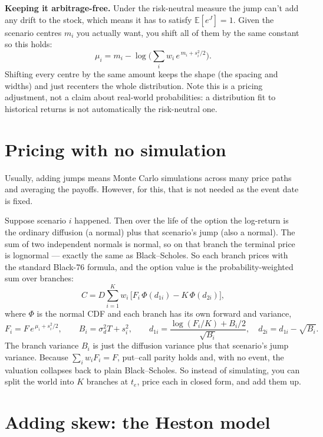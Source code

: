 \documentclass[11pt]{article}
\newcommand{\E}{\mathbb E}
\begin{document}
\textbf{Keeping it arbitrage-free.} Under the risk-neutral measure the jump can't
add any drift to the stock, which means it has to satisfy $\E[e^J]=1$. Given the
scenario centres $m_i$ you actually want, you shift all of them by the same
constant so this holds:
\begin{equation}
\mu_i = m_i - \log\!\Big(\textstyle\sum_i w_i\,e^{\,m_i+s_i^2/2}\Big).
\end{equation}
Shifting every centre by the same amount keeps the shape (the spacing and widths)
and just recenters the whole distribution. Note this is a pricing adjustment, not a claim
about real-world probabilities: a distribution fit to historical returns is not
automatically the risk-neutral one.

\section{Pricing with no simulation}

Usually, adding jumps means Monte Carlo simulations across many price paths and averaging
the payoffs. However, for this, that is not needed as the event date is fixed. 

Suppose scenario $i$ happened. Then over the life of the option the log-return is
the ordinary diffusion (a normal) plus that scenario's jump (also a normal). The
sum of two independent normals is normal, so on that branch the terminal price is
lognormal --- exactly the same as Black--Scholes. So each branch prices with the
standard Black-76 formula, and the option value is the probability-weighted sum
over branches:
\begin{equation}
C = D\sum_{i=1}^{K} w_i\,\big[F_i\,\Phi(d_{1i})-K\,\Phi(d_{2i})\big],
\end{equation}
where $\Phi$ is the normal CDF and each branch has its own forward and variance,
\begin{equation}
F_i = F\,e^{\,\mu_i+s_i^2/2},\qquad
B_i = \sigma_d^2 T + s_i^2,\qquad
d_{1i}=\frac{\log(F_i/K)+B_i/2}{\sqrt{B_i}},\quad d_{2i}=d_{1i}-\sqrt{B_i}.
\end{equation}
The branch variance $B_i$ is just the diffusion variance plus that scenario's jump
variance. Because $\sum_i w_iF_i=F$, put--call parity holds and, with no event, the
valuation collapses back to plain Black--Scholes. So instead of simulating, you
can split the world into $K$ branches at $t_e$, price each in closed form, and add them
up.

\section{Adding skew: the Heston model}
\end{document}
